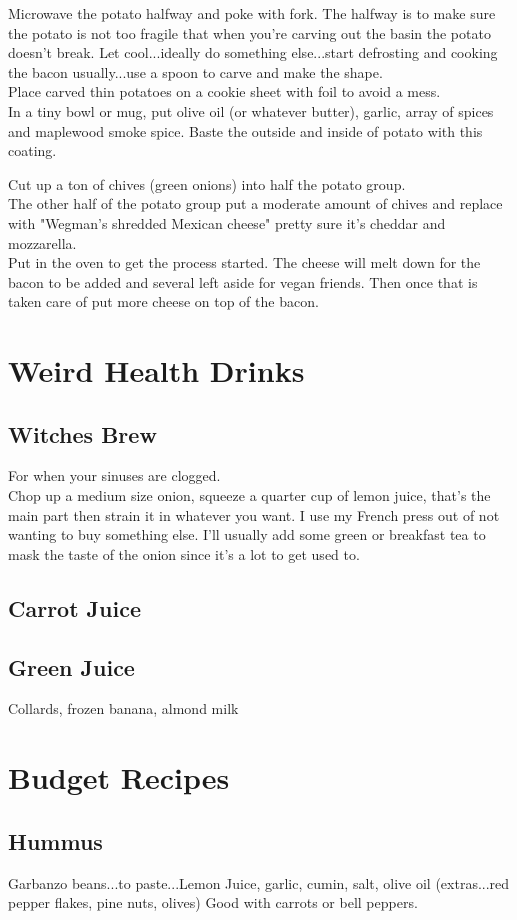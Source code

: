 \documentclass{article}
\begin{document}
Microwave the potato halfway and poke with fork. The halfway is to make sure the potato is not too fragile that when you're carving out the basin the potato doesn't break. Let cool...ideally do something else...start defrosting and cooking the bacon usually...use a spoon to carve and make the shape. \\ 
Place carved thin potatoes on a cookie sheet with foil to avoid a mess. \\
In a tiny bowl or mug, put olive oil (or whatever butter), garlic, array of spices and maplewood smoke spice. Baste the outside and inside of potato with this coating. 

Cut up a ton of chives (green onions) into half the potato group. \\ 
The other half of the potato group put a moderate amount of chives and replace with "Wegman's shredded Mexican cheese" pretty sure it's cheddar and mozzarella. \\ 
Put in the oven to get the process started. The cheese will melt down for the bacon to be added and several left aside for vegan friends. Then once that is taken care of put more cheese on top of the bacon. \\ 



\section*{Weird Health Drinks}

\subsection*{Witches Brew} 
For when your sinuses are clogged. \\ 
Chop up a medium size onion, squeeze a quarter cup of lemon juice, that's the main part then strain it in whatever you want. I use my French press out of not wanting to buy something else. I'll usually add some green or breakfast tea to mask the taste of the onion since it's a lot to get used to. 

\subsection*{Carrot Juice} 

\subsection*{Green Juice}
Collards, frozen banana, almond milk 

\section*{Budget Recipes}

\subsection*{Hummus}
Garbanzo beans...to paste...Lemon Juice, garlic, cumin, salt, olive oil (extras...red pepper flakes, pine nuts, olives)
Good with carrots or bell peppers.
\end{document}
